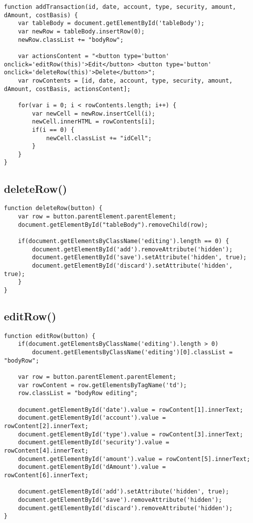 \documentclass[letterpaper]{article}
\begin{document}
\begin{lstlisting}[firstnumber=138]
function addTransaction(id, date, account, type, security, amount, dAmount, costBasis) {
    var tableBody = document.getElementById('tableBody');
    var newRow = tableBody.insertRow(0);
    newRow.classList += "bodyRow";

    var actionsContent = "<button type='button' onclick='editRow(this)'>Edit</button> <button type='button' onclick='deleteRow(this)'>Delete</button>";
    var rowContents = [id, date, account, type, security, amount, dAmount, costBasis, actionsContent];

    for(var i = 0; i < rowContents.length; i++) {
        var newCell = newRow.insertCell(i);
        newCell.innerHTML = rowContents[i];
        if(i == 0) {
            newCell.classList += "idCell";
        }
    }
}
\end{lstlisting}

\subsection{deleteRow()}

\begin{lstlisting}[firstnumber=172]
function deleteRow(button) {
    var row = button.parentElement.parentElement;
    document.getElementById("tableBody").removeChild(row);

    if(document.getElementsByClassName('editing').length == 0) {
        document.getElementById('add').removeAttribute('hidden');
        document.getElementById('save').setAttribute('hidden', true);
        document.getElementById('discard').setAttribute('hidden', true);
    }
}
\end{lstlisting}

\subsection{editRow()}

\begin{lstlisting}[firstnumber=183]
function editRow(button) {
    if(document.getElementsByClassName('editing').length > 0)
        document.getElementsByClassName('editing')[0].classList = "bodyRow";

    var row = button.parentElement.parentElement;
    var rowContent = row.getElementsByTagName('td');
    row.classList = "bodyRow editing";

    document.getElementById('date').value = rowContent[1].innerText;
    document.getElementById('account').value = rowContent[2].innerText;
    document.getElementById('type').value = rowContent[3].innerText;
    document.getElementById('security').value = rowContent[4].innerText;
    document.getElementById('amount').value = rowContent[5].innerText;
    document.getElementById('dAmount').value = rowContent[6].innerText;

    document.getElementById('add').setAttribute('hidden', true);
    document.getElementById('save').removeAttribute('hidden');
    document.getElementById('discard').removeAttribute('hidden');
}
\end{lstlisting}
\end{document}
